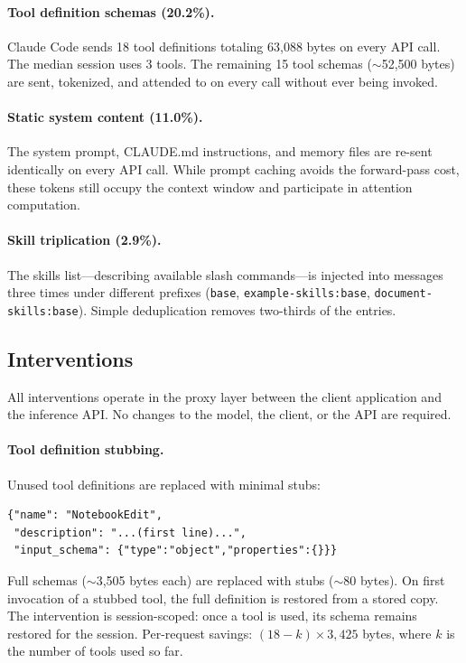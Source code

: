 \paragraph{Tool definition schemas (20.2\%).}
Claude Code sends 18 tool definitions totaling 63{,}088 bytes on
every API call. The median session uses 3 tools. The remaining 15
tool schemas ($\sim$52{,}500 bytes) are sent, tokenized, and
attended to on every call without ever being invoked.

\paragraph{Static system content (11.0\%).}
The system prompt, CLAUDE.md instructions, and memory files are
re-sent identically on every API call. While prompt caching avoids
the forward-pass cost, these tokens still occupy the context window
and participate in attention computation.

\paragraph{Skill triplication (2.9\%).}
The skills list---describing available slash commands---is injected
into messages three times under different prefixes (\texttt{base},
\texttt{example-skills:base}, \texttt{document-skills:base}).
Simple deduplication removes two-thirds of the entries.

\subsection{Interventions}
\label{sec:interventions}

All interventions operate in the proxy layer between the client
application and the inference API. No changes to the model, the
client, or the API are required.

\paragraph{Tool definition stubbing.}
Unused tool definitions are replaced with minimal stubs:
\begin{verbatim}
{"name": "NotebookEdit",
 "description": "...(first line)...",
 "input_schema": {"type":"object","properties":{}}}
\end{verbatim}
Full schemas ($\sim$3{,}505 bytes each) are replaced with stubs
($\sim$80 bytes). On first invocation of a stubbed tool, the full
definition is restored from a stored copy. The intervention is
session-scoped: once a tool is used, its schema remains restored
for the session. Per-request savings: $(18 - k) \times 3{,}425$
bytes, where $k$ is the number of tools used so far.

